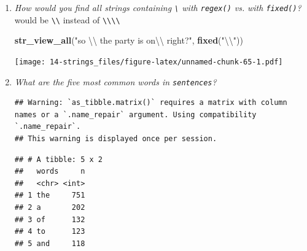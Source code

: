 \documentclass[]{book}
\newenvironment{Shaded}{\begin{snugshade}}{\end{snugshade}}
\newcommand{\CharTok}[1]{\textcolor[rgb]{0.31,0.60,0.02}{#1}}
\newcommand{\DataTypeTok}[1]{\textcolor[rgb]{0.13,0.29,0.53}{#1}}
\newcommand{\DecValTok}[1]{\textcolor[rgb]{0.00,0.00,0.81}{#1}}
\newcommand{\KeywordTok}[1]{\textcolor[rgb]{0.13,0.29,0.53}{\textbf{#1}}}
\newcommand{\NormalTok}[1]{#1}
\newcommand{\OperatorTok}[1]{\textcolor[rgb]{0.81,0.36,0.00}{\textbf{#1}}}
\newcommand{\OtherTok}[1]{\textcolor[rgb]{0.56,0.35,0.01}{#1}}
\newcommand{\StringTok}[1]{\textcolor[rgb]{0.31,0.60,0.02}{#1}}
\theoremstyle{definition}
\theoremstyle{definition}
\theoremstyle{definition}
\theoremstyle{remark}
\begin{document}
\begin{enumerate}
\def\labelenumi{\arabic{enumi}.}
\item
  \emph{How would you find all strings containing
  \texttt{\textbackslash{}} with \texttt{regex()} vs.} \emph{with
  \texttt{fixed()}?} would be \texttt{\textbackslash{}\textbackslash{}}
  instead of
  \texttt{\textbackslash{}\textbackslash{}\textbackslash{}\textbackslash{}}

\begin{Shaded}
\begin{Highlighting}[]
\KeywordTok{str_view_all}\NormalTok{(}\StringTok{"so }\CharTok{\textbackslash{}\textbackslash{}}\StringTok{ the party is on}\CharTok{\textbackslash{}\textbackslash{}}\StringTok{ right?"}\NormalTok{, }\KeywordTok{fixed}\NormalTok{(}\StringTok{"}\CharTok{\textbackslash{}\textbackslash{}}\StringTok{"}\NormalTok{))}
\end{Highlighting}
\end{Shaded}

  \texttt{[image: 14-strings\_files/figure-latex/unnamed-chunk-65-1.pdf]}
\item
  \emph{What are the five most common words in \texttt{sentences}?}

\begin{Shaded}
\end{Shaded}

\begin{verbatim}
## Warning: `as_tibble.matrix()` requires a matrix with column names or a `.name_repair` argument. Using compatibility `.name_repair`.
## This warning is displayed once per session.
\end{verbatim}

\begin{verbatim}
## # A tibble: 5 x 2
##   words     n
##   <chr> <int>
## 1 the     751
## 2 a       202
## 3 of      132
## 4 to      123
## 5 and     118
\end{verbatim}
\end{enumerate}
\end{document}
